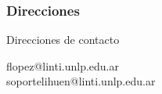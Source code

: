 \documentclass{beamer}[10]
\begin{document}
\frame
{
\frametitle{Direcciones}

\begin{block}{Direcciones de contacto}
\begin{center}
flopez@linti.unlp.edu.ar \\
soportelihuen@linti.unlp.edu.ar
\end{center}
\end{block}

}


\end{document}
